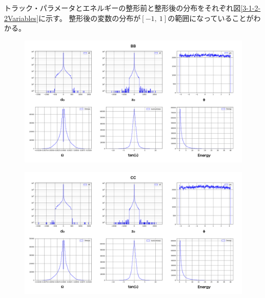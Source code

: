 トラック・パラメータとエネルギーの整形前と整形後の分布をそれぞれ図\ref{3-1-2-2Variables}に示す。
整形後の変数の分布が$[-1,\ 1]$の範囲になっていることがわかる。

\begin{figure}[htbp]
 \centering
  \begin{minipage}{1.0\textwidth}
  \centering
   \begin{minipage}{0.48\textwidth}
    \centering
    \includegraphics[width=1.0\textwidth, clip]{Figure/3Networks/3-1-2-2OriginalVariablesBB.png}
    \label{3-1-2-2OriginalVariablesBB}
   \end{minipage}
   \begin{minipage}{0.48\textwidth}
   \centering
    \includegraphics[width=1.0\textwidth, clip]{Figure/3Networks/3-1-2-2OriginalVariablesCC.png}
    \label{3-1-2-2OriginalVariablesCC}
   \end{minipage}
  \end{minipage}
  

\end{figure}
